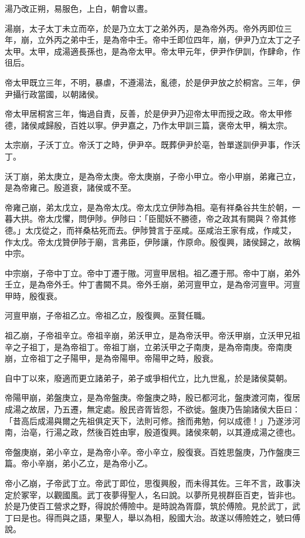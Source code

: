 \begin{pinyinscope}
湯乃改正朔，易服色，上白，朝會以晝。

湯崩，太子太丁未立而卒，於是乃立太丁之弟外丙，是為帝外丙。帝外丙即位三年，崩，立外丙之弟中壬，是為帝中壬。帝中壬即位四年，崩，伊尹乃立太丁之子太甲。太甲，成湯適長孫也，是為帝太甲。帝太甲元年，伊尹作伊訓，作肆命，作徂后。

帝太甲既立三年，不明，暴虐，不遵湯法，亂德，於是伊尹放之於桐宮。三年，伊尹攝行政當國，以朝諸侯。

帝太甲居桐宮三年，悔過自責，反善，於是伊尹乃迎帝太甲而授之政。帝太甲修德，諸侯咸歸殷，百姓以寧。伊尹嘉之，乃作太甲訓三篇，褒帝太甲，稱太宗。

太宗崩，子沃丁立。帝沃丁之時，伊尹卒。既葬伊尹於亳，咎單遂訓伊尹事，作沃丁。

沃丁崩，弟太庚立，是為帝太庚。帝太庚崩，子帝小甲立。帝小甲崩，弟雍己立，是為帝雍己。殷道衰，諸侯或不至。

帝雍己崩，弟太戊立，是為帝太戊。帝太戊立伊陟為相。亳有祥桑谷共生於朝，一暮大拱。帝太戊懼，問伊陟。伊陟曰：「臣聞妖不勝德，帝之政其有闕與？帝其修德。」太戊從之，而祥桑枯死而去。伊陟贊言于巫咸。巫咸治王家有成，作咸艾，作太戊。帝太戊贊伊陟于廟，言弗臣，伊陟讓，作原命。殷復興，諸侯歸之，故稱中宗。

中宗崩，子帝中丁立。帝中丁遷于隞。河亶甲居相。祖乙遷于邢。帝中丁崩，弟外壬立，是為帝外壬。仲丁書闕不具。帝外壬崩，弟河亶甲立，是為帝河亶甲。河亶甲時，殷復衰。

河亶甲崩，子帝祖乙立。帝祖乙立，殷復興。巫賢任職。

祖乙崩，子帝祖辛立。帝祖辛崩，弟沃甲立，是為帝沃甲。帝沃甲崩，立沃甲兄祖辛之子祖丁，是為帝祖丁。帝祖丁崩，立弟沃甲之子南庚，是為帝南庚。帝南庚崩，立帝祖丁之子陽甲，是為帝陽甲。帝陽甲之時，殷衰。

自中丁以來，廢適而更立諸弟子，弟子或爭相代立，比九世亂，於是諸侯莫朝。

帝陽甲崩，弟盤庚立，是為帝盤庚。帝盤庚之時，殷已都河北，盤庚渡河南，復居成湯之故居，乃五遷，無定處。殷民咨胥皆怨，不欲徙。盤庚乃告諭諸侯大臣曰：「昔高后成湯與爾之先祖俱定天下，法則可修。捨而弗勉，何以成德！」乃遂涉河南，治亳，行湯之政，然後百姓由寧，殷道復興。諸侯來朝，以其遵成湯之德也。

帝盤庚崩，弟小辛立，是為帝小辛。帝小辛立，殷復衰。百姓思盤庚，乃作盤庚三篇。帝小辛崩，弟小乙立，是為帝小乙。

帝小乙崩，子帝武丁立。帝武丁即位，思復興殷，而未得其佐。三年不言，政事決定於冢宰，以觀國風。武丁夜夢得聖人，名曰說。以夢所見視群臣百吏，皆非也。於是乃使百工營求之野，得說於傅險中。是時說為胥靡，筑於傅險。見於武丁，武丁曰是也。得而與之語，果聖人，舉以為相，殷國大治。故遂以傅險姓之，號曰傅說。


\end{pinyinscope}
